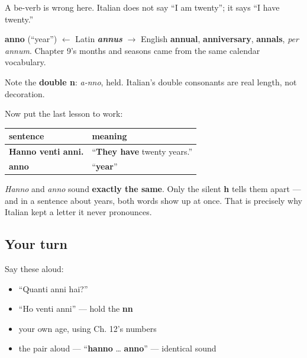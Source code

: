 A be-verb is wrong here. Italian does not say \textquotedblleft{}I am twenty\textquotedblright{}; it says \textquotedblleft{}I have twenty.\textquotedblright{}

\begin{cousinweb}
\textbf{anno} (\textquotedblleft{}year\textquotedblright{}) $\leftarrow$ Latin \emph{\textbf{annus}} $\to$ English \textbf{annual}, \textbf{anniversary}, \textbf{annals}, \emph{per annum}. Chapter 9's months and seasons came from the same calendar vocabulary.

Note the \textbf{double n}: \emph{a-nno}, held. Italian's double consonants are real length, not decoration.
\end{cousinweb}

\begin{grammarlens}[title={Grammar Lens: h earns its keep}]
Now put the last lesson to work:

\noindent
\begin{tabularx}{\linewidth}{@{}>{\raggedright\arraybackslash}X>{\raggedright\arraybackslash}X@{}}
\toprule
\textbf{sentence} & \textbf{meaning} \\
\midrule
\textbf{Hanno venti anni.} & \textquotedblleft{}\textbf{They have} twenty years.\textquotedblright{} \\
\textbf{anno} & \textquotedblleft{}\textbf{year}\textquotedblright{} \\
\bottomrule
\end{tabularx}

\emph{Hanno} and \emph{anno} sound \textbf{exactly the same}. Only the silent \textbf{h} tells them apart — and in a sentence about years, both words show up at once. That is precisely why Italian kept a letter it never pronounces.
\end{grammarlens}

\subsection*{Your turn}
Say these aloud:

\begin{itemize}
\raggedright
  \item \textquotedblleft{}Quanti anni hai?\textquotedblright{}
  \item \textquotedblleft{}Ho venti anni\textquotedblright{} — hold the \textbf{nn}
  \item your own age, using Ch. 12's numbers
  \item the pair aloud — \textquotedblleft{}\textbf{hanno} … \textbf{anno}\textquotedblright{} — identical sound
\end{itemize}


